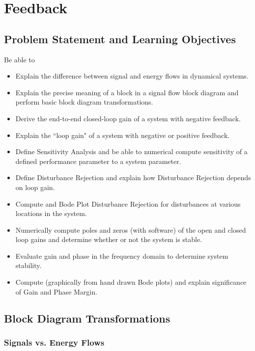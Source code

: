 %
%
%

\chapter{Feedback}\label{FeedbackChapter}

\section{Problem Statement and Learning Objectives}
Be able to

\begin{itemize}
    \item Explain the difference between signal and energy flows in dynamical systems.
    \item Explain the precise meaning of a block in a signal flow block diagram and
    perform basic block diagram transformations.
    \item  Derive the end-to-end closed-loop gain of a system with negative feedback.
    \item Explain the ``loop gain" of a system with negative or positive feedback.
    \item Define Sensitivity Analysis and be able to numerical compute sensitivity of
    a defined performance parameter to a system parameter.
    \item Define Disturbance Rejection and explain how Disturbance Rejection depends on
    loop gain.
    \item Compute and Bode Plot  Disturbance Rejection for disturbances at various locations in the system.
    \item Numerically compute poles and zeros (with software) of the open and closed loop gains and determine whether or not the system is stable.
    \item Evaluate gain and phase in the frequency domain to determine system stability.
    \item Compute (graphically from hand drawn Bode plots) and explain significance of Gain and Phase Margin.
\end{itemize}

\section{Block Diagram Transformations}

\subsection{Signals vs. Energy Flows}

